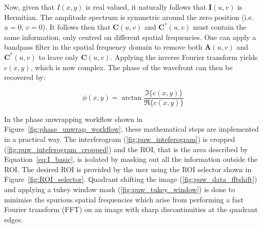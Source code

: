 Now, given that $I(x,y)$ is real valued, it naturally follows that $\boldsymbol{I}(u,v)$ is Hermitian. The amplitude spectrum is symmetric around the zero position (i.e. $u = 0$, $v = 0$). It follows then that $\boldsymbol{C}(u,v)$ and $\boldsymbol{C}^{*}(u,v)$ must contain the same information, only centred on different spatial frequencies. One can apply a bandpass filter in the spatial frequency domain to remove both $\boldsymbol{A}(u,v)$ and $\boldsymbol{C}^{*}(u,v)$ to leave only $\boldsymbol{C}(u,v)$.\cite{lewis1993absolute} Applying the inverse Fourier transform yields $c(x,y)$, which is now complex. The phase of the wavefront can then be recovered by:

\begin{equation}\label{eq:phase}
\phi(x,y) = \arctan \frac{\Im\{c(x,y)\}}{\Re\{c(x,y)\}}
\end{equation}

In the phase unwrapping workflow shown in Figure~\ref{fig:phase_unwrap_workflow}, these mathematical steps are implemented in a practical way. The interferogram (\ref{fig:puw_inteferogram}) is cropped (\ref{fig:puw_inteferogram_cropped}) and the ROI, that is the area described by Equation~\ref{eq:I_basic}, is isolated by masking out all the information outside the ROI. The desired ROI is provided by the user using the ROI selector shown in Figure~\ref{fig:ROI_selector}. Quadrant shifting the image (\ref{fig:puw_data_fftshift}) and applying a tukey window mask (\ref{fig:puw_tukey_window}) is done to minimise the spurious spatial frequencies which arise from performing a fast Fourier transform (FFT) on an image with sharp discontinuities at the quadrant edges.

